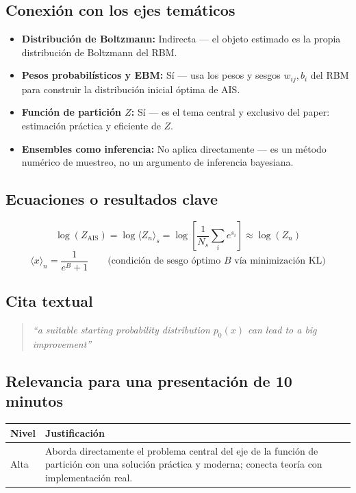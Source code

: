 \documentclass[12pt]{article}
\begin{document}
\subsection*{Conexión con los ejes temáticos}
\begin{itemize}
  \item \textbf{Distribución de Boltzmann:} Indirecta --- el objeto estimado es la propia distribución de Boltzmann del RBM.
  \item \textbf{Pesos probabilísticos y EBM:} Sí --- usa los pesos y sesgos $w_{ij}, b_i$ del RBM para construir la distribución inicial óptima de AIS.
  \item \textbf{Función de partición $Z$:} Sí --- es el tema central y exclusivo del paper: estimación práctica y eficiente de $Z$.
  \item \textbf{Ensembles como inferencia:} No aplica directamente --- es un método numérico de muestreo, no un argumento de inferencia bayesiana.
\end{itemize}

\subsection*{Ecuaciones o resultados clave}
\begin{equation}
\log(Z_{\text{AIS}}) = \log\langle Z_n\rangle_s = \log\left[\frac{1}{N_s}\sum_i e^{s_i}\right] \approx \log(Z_n)
\end{equation}
\begin{equation}
\langle x \rangle_n = \frac{1}{e^{B}+1} \qquad \text{(condición de sesgo óptimo $B$ vía minimización KL)}
\end{equation}

\subsection*{Cita textual}
\begin{quote}
\textit{``a suitable starting probability distribution $p_0(x)$ can lead to a big improvement''}
\end{quote}

\subsection*{Relevancia para una presentación de 10 minutos}
\begin{tabular}{@{}p{2cm}p{11.5cm}@{}}
\toprule
\textbf{Nivel} & \textbf{Justificación} \\
\midrule
Alta & Aborda directamente el problema central del eje de la función de partición con una solución práctica y moderna; conecta teoría con implementación real. \\
\bottomrule
\end{tabular}
\end{document}
